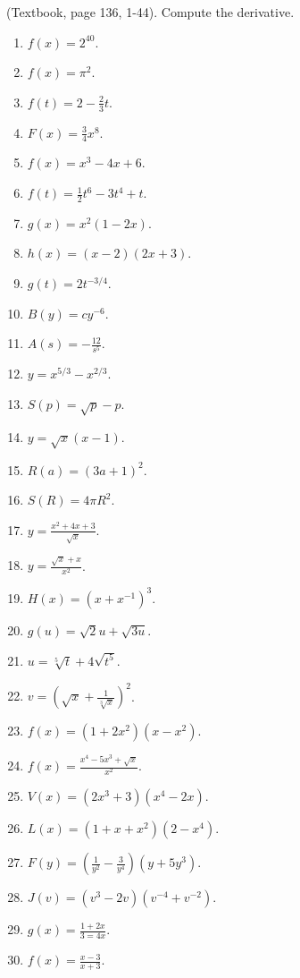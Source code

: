 \begin{problem} (Textbook, page 136, 1-44).
Compute the derivative.
\begin{multicols}{3}
\begin{enumerate}
\item $f(x)=2^{40}$.

\item $f(x)=\pi^2$.

\item $f(t)=2-\frac{2}{3}t$.

\item $F(x)=\frac{3}{4}x^8$.

\item $f(x)=x^3-4x+6$.

\answer{$ $}
\item $f(t)=\frac{1}{2}t^6-3t^4+t$.
\item $g(x)=x^2(1-2x)$. 
\item $h(x)=(x-2)(2x+3)$.
\item $g(t)=2t^{-3/4}$.
\item $B(y)=c y^{-6}$.
\item $A(s)=-\frac{12}{s^5}$.
\item $y=x^{5/3}-x^{2/3}$.
\item $S(p)=\sqrt{p}-p$.
\item $y=\sqrt{x}(x-1)$.
\item $R(a)=(3a+1)^2$.
\item $S(R)=4\pi R^2$.
\item $y=\frac{ x^2+4x+3}{\sqrt{x}}$.
\item $y=\frac{\sqrt{x}+x}{x^2}$.
\item $H(x)=(x+x^{-1})^3$.
\item $g(u)=\sqrt 2 u +\sqrt{3u}$.
\item $u=\sqrt[5]t+4\sqrt{t^5}$.
\item $v=\left(\sqrt{x}+\frac{1}{\sqrt[3]{x}}\right)^2$.
\item $f(x)=(1+2x^2)(x-x^2)$.
\item $f(x)=\frac{x^4-5x^3+\sqrt{x}}{x^2}$.
\item $V(x)=(2x^3+3)(x^4-2x)$.
\item $L(x)=(1+x+x^2)(2-x^4)$.
\item $F(y)=\left(\frac{1}{y^2}-\frac{3}{y^4} \right)(y+5y^3)$.
\item $J(v)=(v^3-2v)(v^{-4}+v^{-2})$.
\item $g(x)=\frac{1+2x}{3=4x}$.
\item $f(x)=\frac{x-3}{x+3}$.

\end{enumerate}
\end{multicols}
\end{problem}
